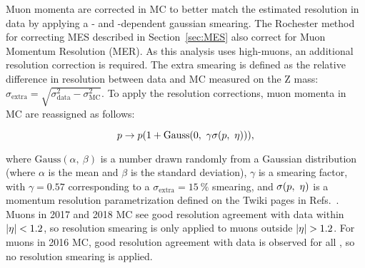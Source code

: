 Muon momenta are corrected in MC to better match the estimated resolution in data by applying a \mom- and \pseudorap-dependent gaussian smearing. The Rochester method for correcting MES described in Section~\ref{sec:MES} also correct for Muon Momentum Resolution (MER). As this analysis uses high-\pt muons, an additional resolution correction is required. The extra smearing is defined as the relative difference in resolution between data and MC measured on the Z mass: $\sigma_{\text{extra}} = \sqrt{\sigma_{\text{data}}^2 - \sigma_{\text{MC}}^2}$. To apply the resolution corrections, muon momenta in MC are reassigned as follows: 

\begin{equation}
  p \rightarrow p(1 + \text{Gauss}(0,~\gamma\sigma(p,~\eta))), 
\end{equation}

where $\text{Gauss}(\alpha,~\beta)$ is a number drawn randomly from a Gaussian distribution (where $\alpha$ is the mean and $\beta$ is the standard deviation), $\gamma$ is a smearing factor, with $\gamma=0.57$ corresponding to a $\sigma_{\text{extra}} = \SI{15}{\%}$ smearing, and $\sigma(p,~\eta)$ is a momentum resolution parametrization defined on the Twiki pages in Refs.~\cite{MuonTwiki2016}\cite{MuonTwiki2017}\cite{MuonTwiki2018}. Muons in 2017 and 2018 MC see good resolution agreement with data within $\lvert \eta \rvert < 1.2$, so resolution smearing is only applied to muons outside $\lvert \eta \rvert > 1.2$. For muons in 2016 MC, good resolution agreement with data is observed for all \abspseudorap, so no resolution smearing is applied. 